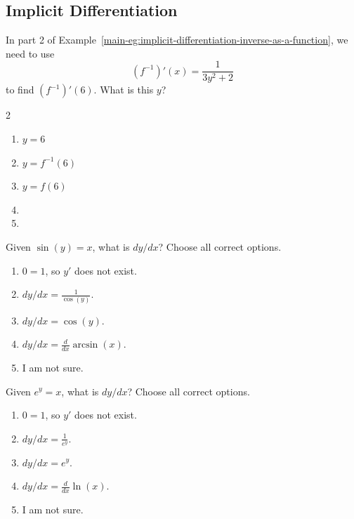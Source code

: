 \documentclass[aspectratio=169, 14pt, t]{beamer}  %
\begin{document}
\subsection{Implicit Differentiation}

\begin{poll}
  In part 2 of Example~\ref{main-eg:implicit-differentiation-inverse-as-a-function}, we need to use \[\left( f^{-1} \right)'(x) =  \frac{1}{3 y^{2} + 2}\] to find \(\left( f^{-1} \right)'(6)\). What is this \(y\)?

  \begin{multicols}{2}
  \begin{enumerate}
    \item \(y = 6\)
    \item \(y = f^{-1}(6)\)
    \item \(y = f(6)\)
    \item 
    \item {}
    \end{enumerate}
  \end{multicols}
  
\end{poll}

\begin{poll}
  Given \(\sin(y) = x\), what is \(dy/dx\)? Choose all correct options.

  \begin{enumerate}
    \item \(0 = 1\), so \(y'\) does not exist.
    \item \(dy/dx = \tfrac{1}{\cos(y)}\).
    \item \(dy/dx = \cos(y)\).
    \item \(dy/dx = \tfrac{d}{dx} \arcsin(x)\).
    \item I am not sure.
  \end{enumerate}
\end{poll}

\begin{poll}
  Given \(e^{y} = x\), what is \(dy/dx\)? Choose all correct options.

  \begin{enumerate}
    \item \(0 = 1\), so \(y'\) does not exist.
    \item \(dy/dx = \tfrac{1}{e^{y}}\).
    \item \(dy/dx = e^{y}\).
    \item \(dy/dx = \tfrac{d}{dx} \ln(x)\).
    \item I am not sure.
  \end{enumerate}
\end{poll}
\end{document}
